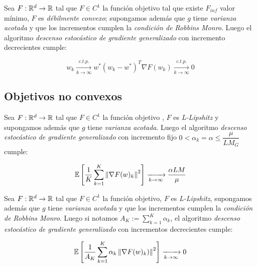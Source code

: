 \begin{theorem}
	Sea $F: {\mathbb{R}}^d \rightarrow {\mathbb{R}}$ tal que $F \in C^1$ la funci\'on objetivo tal que existe $F_{inf}$ valor m\'inimo, $F$ es \textit{d\'ebilmente convexo}; supongamos adem\'as que $g$ tiene \textit{varianza acotada} y que los incrementos cumplen la \textit{condici\'on de Robbins Monro}. Luego el algoritmo \textit{descenso estoc\'astico de gradiente generalizado} con incremento decrecientes cumple:
	
	\begin{subequations}
		\begin{equation*}
		w_k \xrightarrow[k \rightarrow \infty]{c.t.p.} w^*
		\end{equation*}
		\begin{equation*}
		\left(w_k - w^*\right)^T \nabla F(w_k) \xrightarrow[k \rightarrow \infty]{c.t.p.}  0
		\end{equation*}
	\end{subequations}
	
\end{theorem}

\subsection{Objetivos no convexos}

\begin{theorem}
	Sea $F: {\mathbb{R}}^d \rightarrow {\mathbb{R}}$ tal que $F \in C^1$ la funci\'on objetivo , $F$ es \textit{L-Lipshitz} y supongamos adem\'as que $g$ tiene \textit{varianza acotada}. Luego el algoritmo \textit{descenso estoc\'astico de gradiente generalizado} con incremento fijo $0  < \alpha_k = \alpha \leq \dfrac{\mu}{LM_G} $ cumple:
	
	\begin{equation*}
		\mathbb{E} \left[\dfrac{1}{K}\sum\limits_{k=1}^{K} {\left\lVert\nabla F (w)_k\right\rVert^2}\right] \xrightarrow[k \rightarrow \infty]{}  \dfrac{\alpha LM}{\mu}
	\end{equation*}
	
\end{theorem}

\begin{theorem}
	Sea $F: {\mathbb{R}}^d \rightarrow {\mathbb{R}}$ tal que $F \in C^1$ la funci\'on objetivo, $F$ es \textit{L-Lipshitz}, supongamos adem\'as que $g$ tiene \textit{varianza acotada} y que los incrementos cumplen la \textit{condici\'on de Robbins Monro}. Luego si notamos $A_K := \sum\limits_{k=1}^{K} {\alpha_k}$, el algoritmo \textit{descenso estoc\'astico de gradiente generalizado} con incrementos decrecientes cumple:
	
	\begin{equation*}
		\mathbb{E} \left[\dfrac{1}{A_K}\sum\limits_{k=1}^{K} {\alpha_k \left\lVert\nabla F (w)_k)\right\rVert^2}\right] \xrightarrow[k \rightarrow \infty]{} 0
	\end{equation*}
	
\end{theorem}


